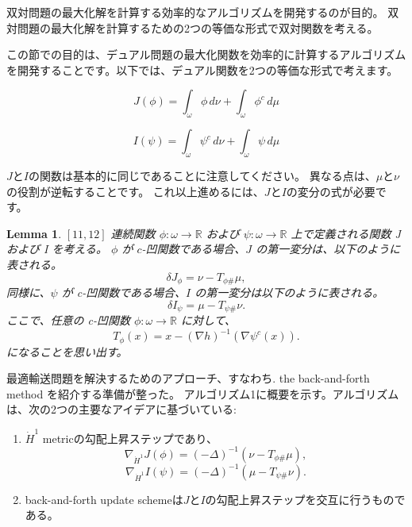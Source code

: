 \documentclass{jsarticle}
\newtheorem{lem}[thm]{Lemma}
\theoremstyle{definition}
\begin{document}
双対問題の最大化解を計算する効率的なアルゴリズムを開発するのが目的。
双対問題の最大化解を計算するための2つの等価な形式で双対関数を考える。


この節での目的は、デュアル問題の最大化関数を効率的に計算するアルゴリズムを開発することです。以下では、デュアル関数を2つの等価な形式で考えます。

\begin{equation}
  J(\phi) = \int_\omega \phi \, d\nu + \int_\omega \phi^c \, d\mu 
\end{equation}

\begin{equation}
  I(\psi) = \int_\omega \psi^c \, d\nu + \int_\omega \psi \, d\mu
\end{equation}

$J$と$I$の関数は基本的に同じであることに注意してください。
異なる点は、$\mu$と$\nu$の役割が逆転することです。
これ以上進めるには、$J$と$I$の変分の式が必要です。

\begin{lem}
  $\left[11,12 \right]$ 
  連続関数 $\phi: \omega \rightarrow \mathbb{R}$ および $\psi: \omega \rightarrow \mathbb{R}$ 上で定義される関数 J および I を考える。
  $\phi$ が $c$-凹関数である場合、$J$ の第一変分は、以下のように表される。
  $$
  \delta J_\phi = \nu - T_{\phi \#} \mu,
  $$
  同様に、$\psi$ が c-凹関数である場合、$I$ の第一変分は以下のように表される。
  $$
  \delta I_\psi = \mu - T_{\psi \# }\nu.
  $$
  ここで、任意の c-凹関数 $\phi: \omega \rightarrow \mathbb{R}$ に対して、
  $$
  T_\phi(x) = x - (\nabla h)^{-1}(\nabla \psi^c(x)).
  $$
  になることを思い出す。
\end{lem}
  
最適輸送問題を解決するためのアプローチ、すなわち. the back-and-forth method を紹介する準備が整った。
アルゴリズム1に概要を示す。アルゴリズムは、次の2つの主要なアイデアに基づいている:

\begin{enumerate}
  \item $\dot{H}^1$ metricの勾配上昇ステップであり、
        $$
        \nabla_{\dot{H}^1} J(\phi) = (- \Delta)^{-1} (\nu - T_{\phi \#} \mu),
        $$
        \begin{equation}
          \nabla_{\dot{H}^1} I(\psi) = (- \Delta)^{-1} (\mu - T_{\psi \#} \nu).
        \end{equation}
  
  \item back-and-forth update schemeは$J$と$I$の勾配上昇ステップを交互に行うものである。
\end{enumerate}
\end{document}
